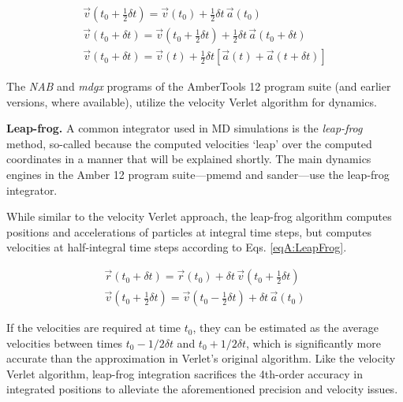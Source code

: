 \begin{align}
   \vec{v}\left(t_0 + \frac 1 2 \delta t\right) = \vec{v}(t_0) + \frac 1 2
         \delta t \, \vec{a}(t_0) \nonumber \\
   \vec{v}(t_0 + \delta t) = \vec{v}\left(t_0 + \frac 1 2 \delta t\right) +
         \frac 1 2 \delta t \, \vec{a}(t_0 + \delta t) \nonumber \\
   \vec{v}(t_0 + \delta t) = \vec{v}(t) + \frac 1 2 \delta t \left[ \vec{a}(t) +
         \vec{a}(t + \delta t) \right]
   \label{eqA:VelVerletVelocities}
\end{align}

The \emph{NAB} and \emph{mdgx} programs of the AmberTools 12 program suite (and
earlier versions, where available), utilize the velocity Verlet algorithm for
dynamics.

\textbf{Leap-frog.} A common integrator used in MD simulations is the
\emph{leap-frog} method, so-called because the computed velocities `leap' over
the computed coordinates in a manner that will be explained shortly. The main
dynamics engines in the Amber 12 program suite---pmemd and sander---use the
leap-frog integrator.

While similar to the velocity Verlet approach, the leap-frog algorithm computes
positions and accelerations of particles at integral time steps, but
computes velocities at half-integral time steps according to Eqs.
\ref{eqA:LeapFrog}.

\begin{align}
   \vec{r}(t_0 + \delta t) = \vec{r}(t_0) + \delta t \, \vec{v}\left(t_0 + \frac
         1 2 \delta t \right) \nonumber \\
   \vec{v}\left(t_0 + \frac 1 2 \delta t\right) = \vec{v}\left(t_0 - \frac 1 2
         \delta t \right) + \delta t \, \vec{a}(t_0)
   \label{eqA:LeapFrog}
\end{align}

If the velocities are required at time $t_0$, they can be estimated as the
average velocities between times $t_0 - 1/2\delta t$ and $t_0 + 1/2 \delta t$,
which is significantly more accurate than the approximation in Verlet's original
algorithm. Like the velocity Verlet algorithm, leap-frog integration sacrifices
the 4th-order accuracy in integrated positions to alleviate the aforementioned
precision and velocity issues. \cite{Allen_Tildesley}
